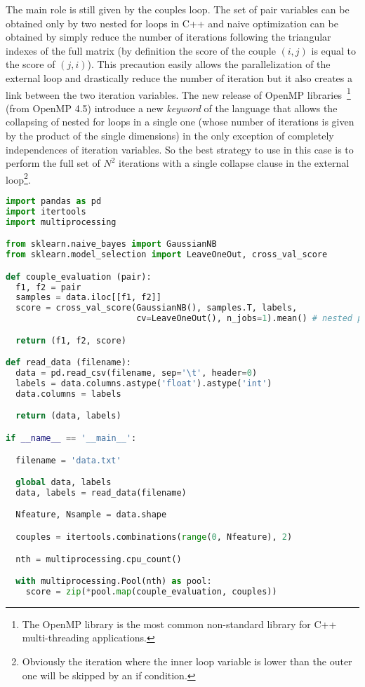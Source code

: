 \documentclass{standalone}
\begin{document}
The main role is still given by the couples loop.
The set of pair variables can be obtained only by two nested for loops in C++ and naive optimization can be obtained by simply reduce the number of iterations following the triangular indexes of the full matrix (by definition the score of the couple $(i, j)$ is equal to the score of $(j, i)$).
This precaution easily allows the parallelization of the external loop and drastically reduce the number of iteration but it also creates a link between the two iteration variables.
The new release of OpenMP libraries~\cite{OpenMP}\footnote{
  The OpenMP library is the most common non-standard library for C++ multi-threading applications.
} (from OpenMP 4.5) introduce a new \emph{keyword} of the language that allows the collapsing of nested for loops in a single one (whose number of iterations is given by the product of the single dimensions) in the only exception of completely independences of iteration variables.
So the best strategy to use in this case is to perform the full set of $N^2$ iterations with a single \textsf{collapse} clause in the external loop\footnote{
  Obviously the iteration where the inner loop variable is lower than the outer one will be skipped by an if condition.
}.

\lstset{style=snippet}
\begin{lstlisting}[language=Python, caption=Python parallel couples evaluation algorithm, label=code:py_couples]
import pandas as pd
import itertools
import multiprocessing

from sklearn.naive_bayes import GaussianNB
from sklearn.model_selection import LeaveOneOut, cross_val_score

def couple_evaluation (pair):
  f1, f2 = pair
  samples = data.iloc[[f1, f2]]
  score = cross_val_score(GaussianNB(), samples.T, labels,
                          cv=LeaveOneOut(), n_jobs=1).mean() # nested parallel loops are not allowed

  return (f1, f2, score)

def read_data (filename):
  data = pd.read_csv(filename, sep='\t', header=0)
  labels = data.columns.astype('float').astype('int')
  data.columns = labels

  return (data, labels)

if __name__ == '__main__':

  filename = 'data.txt'

  global data, labels
  data, labels = read_data(filename)

  Nfeature, Nsample = data.shape

  couples = itertools.combinations(range(0, Nfeature), 2)

  nth = multiprocessing.cpu_count()

  with multiprocessing.Pool(nth) as pool:
    score = zip(*pool.map(couple_evaluation, couples))

\end{lstlisting}
\end{document}

